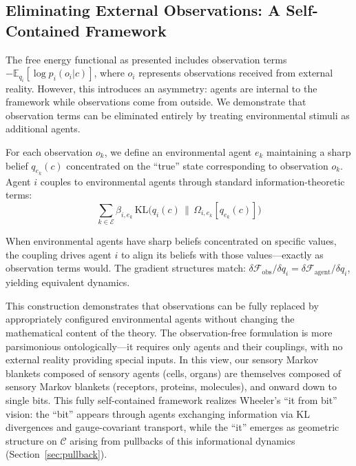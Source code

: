 \documentclass[11pt]{article}
\begin{document}
\subsection{Eliminating External Observations: A Self-Contained Framework}

The free energy functional as presented includes observation terms $-\mathbb{E}_{q_i}[\log p_i(o_i|c)]$, where $o_i$ represents observations received from external reality. However, this introduces an asymmetry: agents are internal to the framework while observations come from outside. We demonstrate that observation terms can be eliminated entirely by treating environmental stimuli as additional agents.

For each observation $o_k$, we define an environmental agent $e_k$ maintaining a sharp belief $q_{e_k}(c)$ concentrated on the ``true'' state corresponding to observation $o_k$. Agent $i$ couples to environmental agents through standard information-theoretic terms:
\begin{equation}
\sum_{k \in \mathcal{E}} \beta_{i,e_k} \, \mathrm{KL}\big(q_i(c) \,\|\, \Omega_{i,e_k}[q_{e_k}(c)]\big)
\end{equation}

When environmental agents have sharp beliefs concentrated on specific values, the coupling drives agent $i$ to align its beliefs with those values---exactly as observation terms would. The gradient structures match: $\delta \mathcal{F}_{\text{obs}}/\delta q_i = \delta \mathcal{F}_{\text{agent}}/\delta q_i$, yielding equivalent dynamics.

This construction demonstrates that observations can be fully replaced by appropriately configured environmental agents without changing the mathematical content of the theory. The observation-free formulation is more parsimonious ontologically---it requires only agents and their couplings, with no external reality providing special inputs. In this view, our sensory Markov blankets composed of sensory agents (cells, organs) are themselves composed of sensory Markov blankets (receptors, proteins, molecules), and onward down to single bits. This fully self-contained framework realizes Wheeler's ``it from bit'' vision: the ``bit'' appears through agents exchanging information via KL divergences and gauge-covariant transport, while the ``it'' emerges as geometric structure on $\mathcal{C}$ arising from pullbacks of this informational dynamics (Section~\ref{sec:pullback}).
\end{document}
